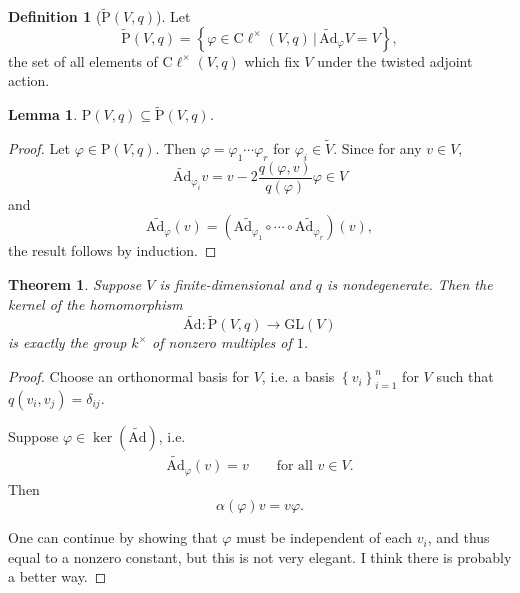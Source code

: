 \documentclass[a4paper]{report}
\newcommand{\cliff}{\mathrm{C}\ell}
\newcommand{\Ad}{\mathrm{Ad}}
\newcommand{\tAd}{\widetilde{\mathrm{Ad}}}
\newcommand{\tP}{\tilde{\mathrm{P}}}
\newcommand{\GL}{\mathrm{GL}}
\theoremstyle{definition}
\newtheorem{definition}{Definition}[section]
\theoremstyle{plain}
\newtheorem{theorem}{Theorem}[section]
\newtheorem{lemma}{Lemma}[section]
\theoremstyle{remark}
\begin{document}
\begin{definition}[$\tP(V, q)$]
  \label{def:twistedp}
  Let 
  \begin{equation*}
    \tP(V, q) = \left\{ \varphi \in \cliff^{\times}(V, q)\,\bigg|\, \tAd_{\varphi}V = V \right\},
  \end{equation*}
  the set of all elements of $\cliff^{\times}(V, q)$ which fix $V$ under the twisted adjoint action.
\end{definition}
\begin{lemma} $\mathrm{P}(V, q) \subseteq \tP(V, q)$.
\end{lemma}
\begin{proof}
  Let $\varphi \in \mathrm{P}(V, q)$. Then $\varphi = \varphi_{1}\cdots \varphi_{r}$ for $\varphi_{i} \in \tilde{V}$. Since for any $v \in V$, 
  \begin{equation*}
    \tAd_{\varphi_{i}}v = v - 2\frac{q(\varphi, v)}{q(\varphi)}\varphi \in V
  \end{equation*}
  and
  \begin{equation*}
    \widetilde{\Ad_{\varphi}}(v) = (\widetilde{\Ad_{\varphi_{1}}} \circ \cdots \circ \widetilde{\Ad_{\varphi_{r}}}) (v),
  \end{equation*}
  the result follows by induction.
\end{proof}

\begin{theorem}
  \label{thm:kerneloftwistedadjointisscalars}
  Suppose $V$ is finite-dimensional and $q$ is nondegenerate. Then the kernel of the homomorphism
  \begin{equation*}
    \tAd\colon \tP(V, q) \to \GL(V)
  \end{equation*}
  is exactly the group $k^{\times}$ of nonzero multiples of $1$.
\end{theorem} 
\begin{proof}
  Choose an orthonormal basis for $V$, i.e. a basis $\left\{ v_{i} \right\}_{i=1}^{n}$ for $V$ such that $q(v_{i}, v_{j}) = \delta_{ij}$.

  Suppose $\varphi \in \ker(\tAd)$, i.e.
  \begin{eqnarray*}
    \tAd_{\varphi}(v) = v\qquad\text{for all }v \in V.
  \end{eqnarray*}
  Then
  \begin{equation*}
    \alpha(\varphi)v = v\varphi.
  \end{equation*}

  One can continue by showing that $\varphi$ must be independent of each $v_{i}$, and thus equal to a nonzero constant, but this is not very elegant. I think there is probably a better way.
\end{proof}
\end{document}
